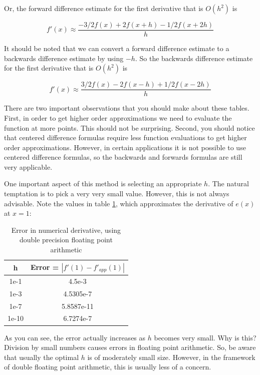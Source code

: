 Or, the forward difference estimate for the first derivative that is $O(h^2)$ is

\begin{equation*}
f'(x) \approx \frac{-3/2f(x) + 2f(x+h) - 1/2 f(x+2h)}{h}
\end{equation*}

It should be noted that we can convert a forward difference estimate to a backwards difference estimate by using $-h$. So the backwards difference estimate for the first derivative that is $O(h^2)$ is

\begin{equation*}
f'(x) \approx \frac{3/2f(x) - 2f(x-h) + 1/2 f(x-2h)}{h}
\end{equation*}

There are two important observations that you should make about these tables. First, in order to get higher order approximations we need to evaluate the function at more points. This should not be surprising. Second, you should notice that centered difference formulas require less function evaluations to get higher order approximations. However, in certain applications it is not possible to use centered difference formulas, so the backwards and forwards formulas are still very applicable.

One important aspect of this method is selecting an appropriate $h$. The natural temptation is to pick a very very small value. However, this is not always advisable. Note the values in table \ref{Table:FloatingError}, which approximates the derivative of $e(x)$ at $x = 1$:

\begin{table}[h!]
\begin{center}
\begin{tabular}{|cc|}
\hline
h & Error  = $|f'(1)-f'_{app}(1)|$ \\ \hline
1e-1 & 4.5e-3 \\
1e-3 & 4.5305e-7 \\
1e-7 & 5.8587e-11 \\
1e-10 & 6.7274e-7 \\ \hline
\end{tabular}
\caption{Error in numerical derivative, using double precision floating point arithmetic}
\label{Table:FloatingError}
\end{center}
\end{table}

As you can see, the error actually increases as $h$ becomes very small. Why is this? Division by small numbers causes errors in floating point arithmetic. So, be aware that usually the optimal $h$ is of moderately small size. However, in the framework of double floating point arithmetic, this is usually less of a concern.

